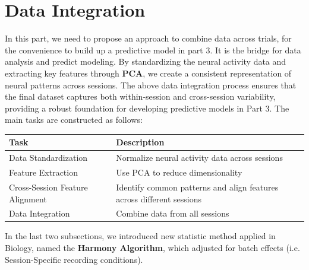 \documentclass{article}
\begin{document}
	\section{Data Integration}
	\par In this part, we need to propose an approach to combine data across trials, for the convenience to build up a predictive model in part 3. It is the bridge for data analysis and predict modeling. By standardizing the neural activity data and extracting key features through \textbf{PCA}, we create a consistent representation of neural patterns across sessions. The above data integration process ensures that the final dataset captures both within-session and cross-session variability, providing a robust foundation for developing predictive models in Part 3. The main tasks are constructed as follows:
	\begin{table}[htbp]
		\centering
		\begin{tabular}{p{4cm}p{10cm}}
			\toprule
			\textbf{Task} & \textbf{Description} \\
			\midrule
			Data Standardization & Normalize neural activity data across sessions\\
			Feature Extraction & Use PCA to reduce dimensionality\\
			Cross-Session Feature Alignment & Identify common patterns and align features across different sessions\\
			Data Integration & Combine data from all sessions\\
			\bottomrule
		\end{tabular}
	\end{table}
	\par In the last two subsections, we introduced new statistic method applied in Biology, named the \textbf{Harmony Algorithm}, which adjusted for batch effects (i.e. Session-Specific recording conditions).
\end{document}
